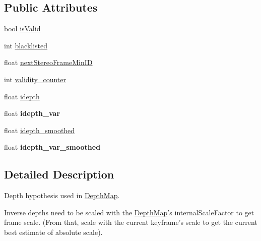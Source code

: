 \subsection*{Public Attributes}
\begin{DoxyCompactItemize}
\item 
bool \hyperlink{classlsd__slam_1_1_depth_map_pixel_hypothesis_aba28a1bf8203d9e0e323b9015d4ac425}{is\-Valid}
\item 
int \hyperlink{classlsd__slam_1_1_depth_map_pixel_hypothesis_a27273a9266af3c4fb91147febeae020a}{blacklisted}
\item 
float \hyperlink{classlsd__slam_1_1_depth_map_pixel_hypothesis_a6de9a990e0a4cbbd2ce810503996f76c}{next\-Stereo\-Frame\-Min\-I\-D}
\item 
int \hyperlink{classlsd__slam_1_1_depth_map_pixel_hypothesis_a56802b2f4413dd295383d142a3499808}{validity\-\_\-counter}
\item 
float \hyperlink{classlsd__slam_1_1_depth_map_pixel_hypothesis_abfc19276c22e1c4fae82f61054a4579f}{idepth}
\item 
\hypertarget{classlsd__slam_1_1_depth_map_pixel_hypothesis_a0a5d3b88ab84669231e215aaf2b98c94}{float {\bfseries idepth\-\_\-var}}\label{classlsd__slam_1_1_depth_map_pixel_hypothesis_a0a5d3b88ab84669231e215aaf2b98c94}

\item 
float \hyperlink{classlsd__slam_1_1_depth_map_pixel_hypothesis_a82ac6c0b56d05a755373fdf23a9cacb2}{idepth\-\_\-smoothed}
\item 
\hypertarget{classlsd__slam_1_1_depth_map_pixel_hypothesis_a336aa95d15dafb1af2af2e02671340c0}{float {\bfseries idepth\-\_\-var\-\_\-smoothed}}\label{classlsd__slam_1_1_depth_map_pixel_hypothesis_a336aa95d15dafb1af2af2e02671340c0}

\end{DoxyCompactItemize}


\subsection{Detailed Description}
Depth hypothesis used in \hyperlink{classlsd__slam_1_1_depth_map}{Depth\-Map}.

Inverse depths need to be scaled with the \hyperlink{classlsd__slam_1_1_depth_map}{Depth\-Map}'s internal\-Scale\-Factor to get frame scale. (From that, scale with the current keyframe's scale to get the current best estimate of absolute scale). 

